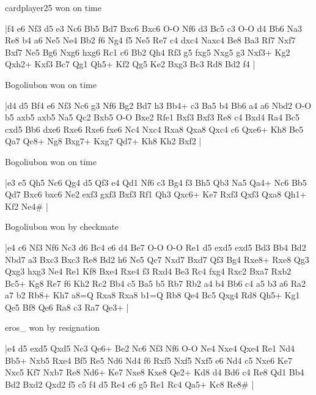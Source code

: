 \showboard

cardplayer25 won on time

\makegametitle
|f4 e6 Nf3 d5 e3 Nc6 Bb5 Bd7 Bxc6 Bxc6 O-O Nf6 d3 Bc5 c3 O-O d4 Bb6 Na3 Re8 b4 a6 Ne5 Ne4 Bb2 f6 Ng4 f5 Ne5 Re7 c4 dxc4 Naxc4 Be8 Ba3 Rf7 Nxf7 Bxf7 Ne5 Bg6 Nxg6 hxg6 Rc1 c6 Bb2 Qh4 Rf3 g5 fxg5 Nxg5 g3 Nxf3+ Kg2 Qxh2+ Kxf3 Bc7 Qg1 Qh5+ Kf2 Qg5 Ke2 Bxg3 Bc3 Rd8 Bd2 f4  |

\showboard

Bogoliubon won on time

\makegametitle
|d4 d5 Bf4 e6 Nf3 Nc6 g3 Nf6 Bg2 Bd7 h3 Bb4+ c3 Ba5 b4 Bb6 a4 a6 Nbd2 O-O b5 axb5 axb5 Na5 Qc2 Bxb5 O-O Bxe2 Rfe1 Bxf3 Bxf3 Re8 c4 Bxd4 Ra4 Bc5 cxd5 Bb6 dxe6 Rxe6 Rxe6 fxe6 Nc4 Nxc4 Rxa8 Qxa8 Qxc4 c6 Qxe6+ Kh8 Be5 Qa7 Qc8+ Ng8 Bxg7+ Kxg7 Qd7+ Kh8 Kh2 Bxf2  |

\showboard

Bogoliubon won on time

\makegametitle
|e3 e5 Qh5 Nc6 Qg4 d5 Qf3 e4 Qd1 Nf6 c3 Bg4 f3 Bh5 Qb3 Na5 Qa4+ Nc6 Bb5 Qd7 Bxc6 bxc6 Ne2 exf3 gxf3 Bxf3 Rf1 Qh3 Qxc6+ Ke7 Rxf3 Qxf3 Qxa8 Qh1+ Kf2 Ne4\#  |

\showboard

Bogoliubon won by checkmate

\makegametitle
|e4 c6 Nf3 Nf6 Nc3 d6 Bc4 e6 d4 Be7 O-O O-O Re1 d5 exd5 exd5 Bd3 Bb4 Bd2 Nbd7 a3 Bxc3 Bxc3 Re8 Bd2 h6 Ne5 Qc7 Nxd7 Bxd7 Qf3 Bg4 Rxe8+ Rxe8 Qg3 Qxg3 hxg3 Ne4 Re1 Kf8 Bxe4 Rxe4 f3 Rxd4 Be3 Rc4 fxg4 Rxc2 Bxa7 Rxb2 Bc5+ Kg8 Re7 f6 Kh2 Rc2 Bb4 c5 Ba5 b5 Rb7 Rb2 a4 b4 Bb6 c4 a5 b3 a6 Ra2 a7 b2 Rb8+ Kh7 a8=Q Rxa8 Rxa8 b1=Q Rb8 Qe4 Bc5 Qxg4 Rd8 Qh5+ Kg1 Qe5 Bf8 Qe6 Ra8 c3 Ra7 Qe3+  |

\showboard

eros\_ won by resignation

\makegametitle
|e4 d5 exd5 Qxd5 Nc3 Qe6+ Be2 Nc6 Nf3 Nf6 O-O Ne4 Nxe4 Qxe4 Re1 Nd4 Bb5+ Nxb5 Rxe4 Bf5 Re5 Nd6 Nd4 f6 Rxf5 Nxf5 Nxf5 e6 Nd4 c5 Nxe6 Ke7 Nxc5 Kf7 Nxb7 Re8 Nd6+ Ke7 Nxe8 Kxe8 Qe2+ Kd8 d4 Bd6 c4 Re8 Qd1 Bb4 Bd2 Bxd2 Qxd2 f5 c5 f4 d5 Re4 c6 g5 Re1 Rc4 Qa5+ Kc8 Re8\#  |

